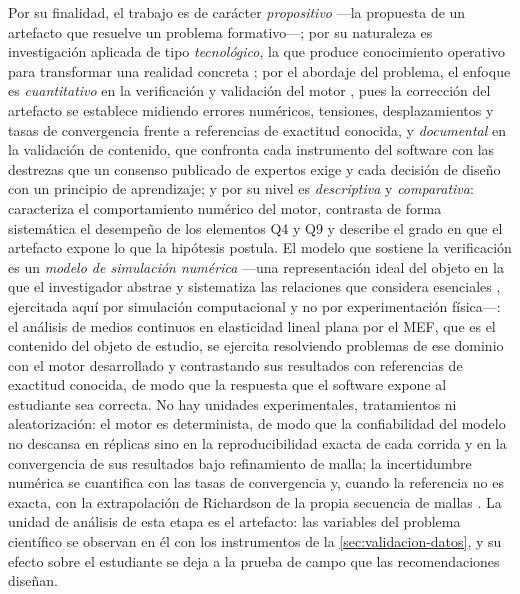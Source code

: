 Por su finalidad, el trabajo es de carácter \emph{propositivo} —la propuesta de un artefacto que resuelve un problema formativo—; por su naturaleza es investigación aplicada de tipo \emph{tecnológico}, la que produce conocimiento operativo para transformar una realidad concreta \autocite[pp.~90-92]{garciacordoba2005tecnologica}; por el abordaje del problema, el enfoque es \emph{cuantitativo} en la verificación y validación del motor \autocite[p.~6]{sampieri2018metodologia}, pues la corrección del artefacto se establece midiendo errores numéricos, tensiones, desplazamientos y tasas de convergencia frente a referencias de exactitud conocida, y \emph{documental} en la validación de contenido, que confronta cada instrumento del software con las destrezas que un consenso publicado de expertos exige y cada decisión de diseño con un principio de aprendizaje; y por su nivel es \emph{descriptiva} y \emph{comparativa}: caracteriza el comportamiento numérico del motor, contrasta de forma sistemática el desempeño de los elementos Q4 y Q9 y describe el grado en que el artefacto expone lo que la hipótesis postula. El modelo que sostiene la verificación es un \emph{modelo de simulación numérica} —una representación ideal del objeto en la que el investigador abstrae y sistematiza las relaciones que considera esenciales \autocite[p.~21]{alvarez_metodologia}, ejercitada aquí por simulación computacional y no por experimentación física—: el análisis de medios continuos en elasticidad lineal plana por el MEF, que es el contenido del objeto de estudio, se ejercita resolviendo problemas de ese dominio con el motor desarrollado y contrastando sus resultados con referencias de exactitud conocida, de modo que la respuesta que el software expone al estudiante sea correcta. No hay unidades experimentales, tratamientos ni aleatorización: el motor es determinista, de modo que la confiabilidad del modelo no descansa en réplicas sino en la reproducibilidad exacta de cada corrida y en la convergencia de sus resultados bajo refinamiento de malla; la incertidumbre numérica se cuantifica con las tasas de convergencia y, cuando la referencia no es exacta, con la extrapolación de Richardson de la propia secuencia de mallas \autocite[pp.~309-312]{oberkampf2010vv}. La unidad de análisis de esta etapa es el artefacto: las variables del problema científico se observan en él con los instrumentos de la \autoref{sec:validacion-datos}, y su efecto sobre el estudiante se deja a la prueba de campo que las recomendaciones diseñan.

